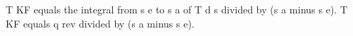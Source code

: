 T KF equals the integral from s e to s a of T d s divided by (s a minus s e).  
T KF equals q rev divided by (s a minus s e).